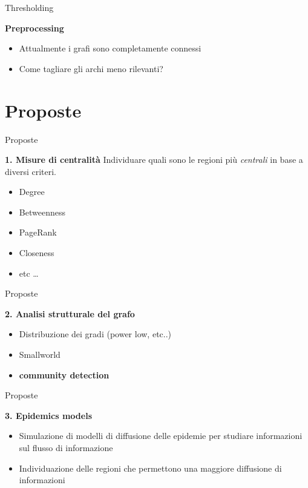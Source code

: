 \documentclass[10pt, compress]{beamer}
\begin{document}
		
		\begin{frame}{Thresholding}
			\begin{block}{\textbf{Preprocessing}}
				\begin{itemize}
					\item Attualmente i grafi sono completamente connessi
					\item Come tagliare gli archi meno rilevanti?
				\end{itemize}
			\end{block}
		\end{frame}
		
		\section{Proposte}
			\begin{frame}{Proposte}
				\begin{block}{\textbf{1. Misure di centralità}}
					Individuare quali sono le regioni più \emph{centrali} in base a diversi criteri. \newline
					\begin{itemize}
						\item Degree
						\item Betweenness
						\item PageRank
						\item Closeness
						\item etc \dots
					\end{itemize}
				\end{block}
			\end{frame}
			
			\begin{frame}{Proposte}
				\begin{block}{\textbf{2. Analisi strutturale del grafo}}
					\begin{itemize}
						\item Distribuzione dei gradi (power low, etc..)
						\item Smallworld
						\item \textbf{community detection}
					\end{itemize}
				\end{block}
			\end{frame}
			
			\begin{frame}{Proposte}
				\begin{block}{\textbf{3. Epidemics models}}
					\begin{itemize}
						\item Simulazione di modelli di diffusione delle epidemie per studiare informazioni sul flusso di informazione
						\item Individuazione delle regioni  che permettono una maggiore diffusione di informazioni
					\end{itemize}
				\end{block}
			\end{frame}
			
			
\end{document}
